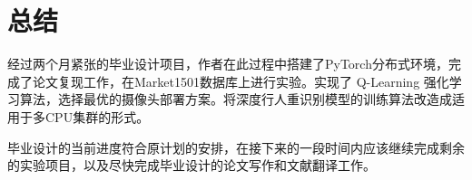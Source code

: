 \section{总结}
经过两个月紧张的毕业设计项目，作者在此过程中搭建了PyTorch分布式环境，完成了论文复现工作，在Market1501\cite{zheng2015scalable}数据库上进行实验。实现了 Q-Learning 强化学习算法，选择最优的摄像头部署方案。将深度行人重识别模型的训练算法改造成适用于多CPU集群的形式。

毕业设计的当前进度符合原计划的安排，在接下来的一段时间内应该继续完成剩余的实验项目，以及尽快完成毕业设计的论文写作和文献翻译工作。